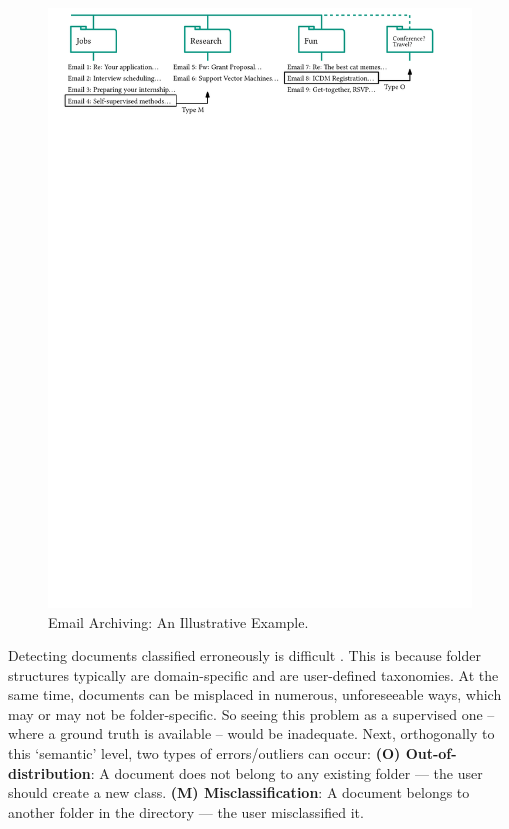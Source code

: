 \begin{figure}
	\centering
	\includegraphics[width=\linewidth]{part1-figures/illustrative_example_2-compressed.pdf}
	\caption{Email Archiving: An Illustrative Example.}
	\label{fig:illustrative_example}
\end{figure}

Detecting documents classified erroneously is difficult \cite{DBLP:journals/tnn/FrenayV14, DBLP:series/isrl/2015-72}. This is because folder structures typically are domain-specific and are user-defined taxonomies. At the same time, documents can be misplaced in numerous, unforeseeable ways, which may or may not be folder-specific. 
So seeing this problem as a supervised one -- where a ground truth is available -- would be inadequate. Next, orthogonally to this `semantic' level, two types of errors/outliers can occur: \textbf{(O) Out-of-distribution}: A document does not belong to any existing folder --- the user should create a new class. %
\textbf{(M) Misclassification}: A document belongs to another folder in the directory --- the user misclassified it.

